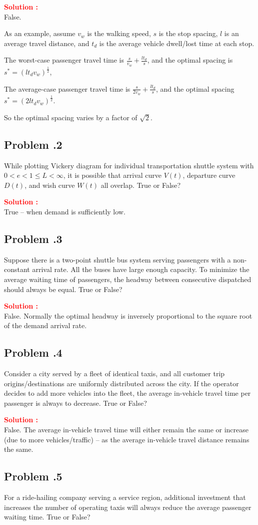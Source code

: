 \documentclass[12pt]{article}
\newcommand{\customsubsection}[1]{
  \subsection*{Problem \thesection.#1}
}
\begin{document}
\textbf{\textcolor{red}{Solution :}} \\
False. 

As an example, assume $v_w$ is the walking speed, $s$ is the stop spacing, $l$ is an average travel distance, and $t_d$ is the average vehicle dwell/lost time at each stop.

The worst-case passenger travel time is \( \frac{s}{v_w} + \frac{lt_d}{s}\), and the optimal spacing is
\( s^\ast = \left( l t_dv_w \right)^\frac{1}{2} \),

The average-case passenger travel time is \( \frac{s}{2 v_w} + \frac{lt_d}{s} \), and the optimal spacing \( s^\ast = \left(2 l t_d v_w \right)^\frac{1}{2}
\).

So the optimal spacing varies by a factor of \(\sqrt{2}\).
   
\newpage

\customsubsection{2}
While plotting Vickery diagram for individual transportation shuttle system with $0<e<1\le L<\infty$, it is possible that arrival curve $V(t)$, departure curve $D(t)$, and wish curve $W(t)$ all overlap. True or False? 
    
\textbf{\textcolor{red}{Solution :}} \\
True – when demand is sufficiently low.
\newpage

\customsubsection{3}
Suppose there is a two-point shuttle bus system serving passengers with a non-constant arrival rate. All the buses have large enough capacity. To minimize the average waiting time of passengers, the headway between consecutive dispatched should always be equal. True or False?

\textbf{\textcolor{red}{Solution :}} \\
False. Normally the optimal headway is inversely proportional to the square root of the demand arrival rate.
\newpage

\customsubsection{4}
Consider a city served by a fleet of identical taxis, and all customer trip origins/destinations are uniformly distributed across the city. If the operator decides to add more vehicles into the fleet, the average in-vehicle travel time per passenger is always to decrease. True or False?


\textbf{\textcolor{red}{Solution :}} \\
False. The average in-vehicle travel time will either remain the same or increase (due to more vehicles/traffic) – as the average in-vehicle travel distance remains the same.
\newpage

\customsubsection{5}
For a ride-hailing company serving a service region, additional investment that increases the number of operating taxis will always reduce the average passenger waiting time. True or False?
\end{document}
